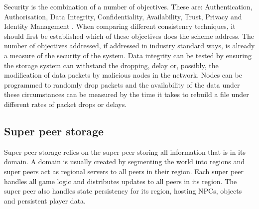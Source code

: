 \documentclass[10pt,a4paper,journal,cspaper,compsoc]{IEEEtran}
\begin{document}
Security is the combination of a number of objectives. These are: Authentication, Authorisation, Data Integrity, Confidentiality, Availability,
Trust, Privacy and Identity Management \cite{distributed_systems_security}. When comparing different consistency techniques, it should first be
established which of these objectives does the scheme address. The number of objectives addressed, if addressed in industry standard ways, is already
a measure of the security of the system. Data integrity can be tested by ensuring the storage system can withstand the dropping, delay or, possibly,
the modification of data packets by malicious nodes in the network. Nodes can be programmed to randomly drop packets and the availability of the data
under these circumstances can be measured by the time it takes to rebuild a file under different rates of packet drops or delays.

\subsection{Super peer storage}
\label{super_peer_storage}

Super peer storage relies on the super peer storing all information that is in its domain. A domain is usually created by segmenting the world into
regions and super peers act as regional servers to all peers in their region. Each super peer handles all game logic and distributes updates to all
peers in its region. The super peer also handles state persistency for its region, hosting NPCs, objects and persistent player data.
\end{document}
